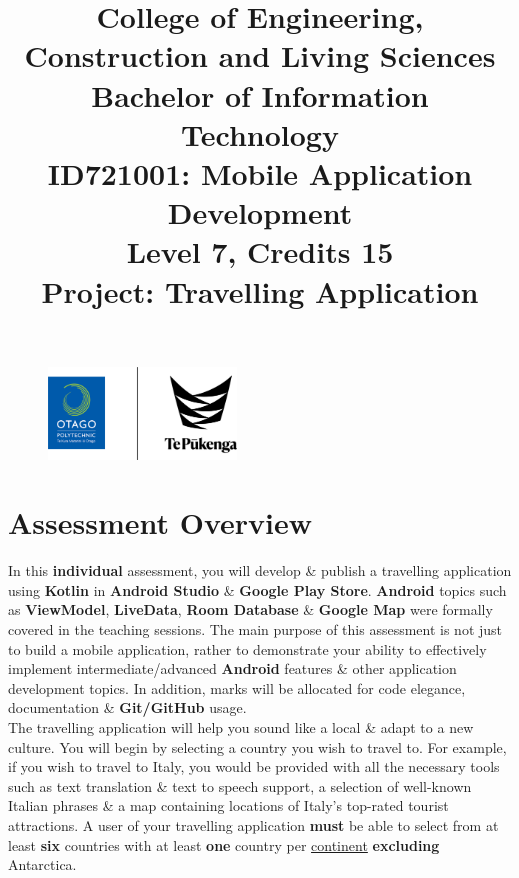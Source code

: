 \documentclass{article}
\author{}
\begin{document}
\begin{figure}
	\centering
	\includegraphics[width=50mm]{../../resources/img/logo.png}
\end{figure}

\title{College of Engineering, Construction and Living Sciences\\Bachelor of Information Technology\\ID721001: Mobile Application Development\\Level 7, Credits 15\\\textbf{Project: Travelling Application}}
\date{}
\maketitle

\section*{Assessment Overview}
In this \textbf{individual} assessment, you will develop \& publish a travelling application using \textbf{Kotlin} in \textbf{Android Studio} \& \textbf{Google Play Store}. \textbf{Android} topics such as \textbf{ViewModel}, \textbf{LiveData}, \textbf{Room Database} \& \textbf{Google Map} were formally covered in the teaching sessions. The main purpose of this assessment is not just to build a mobile application, rather to demonstrate your ability to effectively implement intermediate/advanced \textbf{Android} features \& other application development topics. In addition, marks will be allocated for code elegance, documentation \& \textbf{Git/GitHub} usage. \\

The travelling application will help you sound like a local \& adapt to a new culture. You will begin by selecting a country you wish to travel to. For example, if you wish to travel to Italy, you would be provided with all the necessary tools such as text translation \& text to speech support, a selection of well-known Italian phrases \& a map containing locations of Italy's top-rated tourist attractions. A user of your travelling application \textbf{must} be able to select from at least \textbf{six} countries with at least \textbf{one} country per \href{https://www.worldometers.info/geography/7-continents/}{continent} \textbf{excluding} Antarctica.
\end{document}
